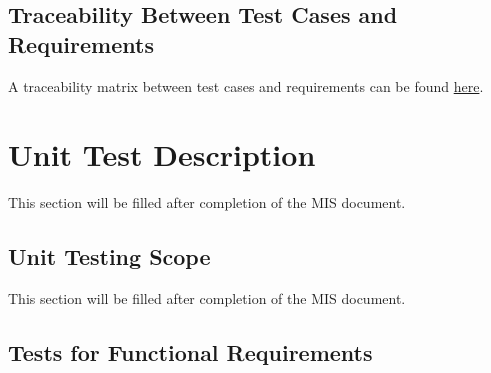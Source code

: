 \documentclass[12pt, titlepage]{article}
\begin{document}
\subsection{Traceability Between Test Cases and Requirements}

A traceability matrix between test cases and requirements can be found
\href{https://github.com/PlutosCapstone/Plutos/blob/main/docs/VnVPlan/traceability_tests_and_requirements.xlsx}{here}.

\newpage

\section{Unit Test Description}

This section will be filled after completion of the MIS document.



\subsection{Unit Testing Scope}

This section will be filled after completion of the MIS document.


\subsection{Tests for Functional Requirements}
\end{document}
